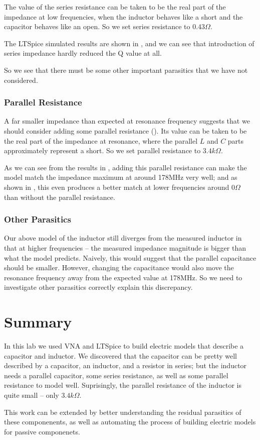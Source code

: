 \documentclass{article}
\begin{document}
The value of the series resistance can be taken to be the real part of the impedance at low frequencies, when the inductor behaves like a short and the capacitor behaves like an open.
So we set series resistance to $0.43\Omega$.

The LTSpice simulated results are shown in , and we can see that introduction of series impedance hardly reduced the Q value at all.

So we see that there must be some other important parasitics that we have not considered.

\subsubsection{Parallel Resistance}

A far smaller impedance than expected at resonance frequency suggests that we should consider adding some parallel resistance ().
Its value can be taken to be the real part of the impedance at resonance, where the parallel $L$ and $C$ parts approximately represent a short.
So we set parallel resistance to $3.4k\Omega$.

As we can see from the results in , adding this parallel resistance can make the model match the impedance maximum at around 178MHz very well;
and as shown in , this even produces a better match at lower frequencies around $0\Omega$ than without the parallel resistance.

\subsubsection{Other Parasitics}
Our above model of the inductor still diverges from the measured inductor in that at higher frequencies -- the measured impedance magnitude is bigger than what the model predicts.
Naively, this would suggest that the parallel capacitance should be smaller.
However, changing the capacitance would also move the resonance frequency away from the expected value at 178MHz.
So we need to investigate other parasitics correctly explain this discrepancy.

\section{Summary}
In this lab we used VNA and LTSpice to build electric models that describe a capacitor and inductor.
We discovered that the capacitor can be pretty well described by a capacitor, an inductor, and a resistor in series; but the inductor needs a parallel capacitor, some series resistance, as well as some parallel resistance to model well.
Suprisingly, the parallel resistance of the inductor is quite small -- only $3.4k\Omega$.

This work can be extended by better understanding the residual parasitics of these componenents, as well as automating the process of building electric models for passive componenets.
\end{document}
